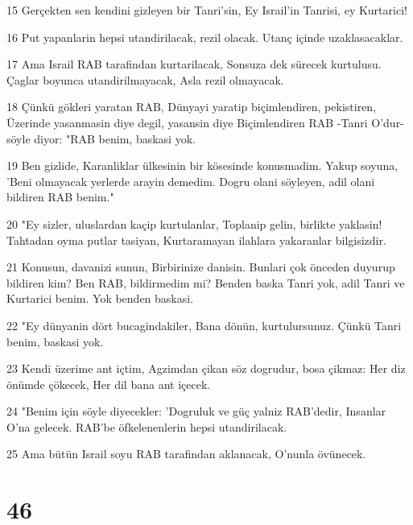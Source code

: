 \par 15 Gerçekten sen kendini gizleyen bir Tanri'sin, Ey Israil'in Tanrisi, ey Kurtarici!
\par 16 Put yapanlarin hepsi utandirilacak, rezil olacak. Utanç içinde uzaklasacaklar.
\par 17 Ama Israil RAB tarafindan kurtarilacak, Sonsuza dek sürecek kurtulusu. Çaglar boyunca utandirilmayacak, Asla rezil olmayacak.
\par 18 Çünkü gökleri yaratan RAB, Dünyayi yaratip biçimlendiren, pekistiren, Üzerinde yasanmasin diye degil, yasansin diye Biçimlendiren RAB -Tanri O'dur- söyle diyor: "RAB benim, baskasi yok.
\par 19 Ben gizlide, Karanliklar ülkesinin bir kösesinde konusmadim. Yakup soyuna, 'Beni olmayacak yerlerde arayin demedim. Dogru olani söyleyen, adil olani bildiren RAB benim."
\par 20 "Ey sizler, uluslardan kaçip kurtulanlar, Toplanip gelin, birlikte yaklasin! Tahtadan oyma putlar tasiyan, Kurtaramayan ilahlara yakaranlar bilgisizdir.
\par 21 Konusun, davanizi sunun, Birbirinize danisin. Bunlari çok önceden duyurup bildiren kim? Ben RAB, bildirmedim mi? Benden baska Tanri yok, adil Tanri ve Kurtarici benim. Yok benden baskasi.
\par 22 "Ey dünyanin dört bucagindakiler, Bana dönün, kurtulursunuz. Çünkü Tanri benim, baskasi yok.
\par 23 Kendi üzerime ant içtim, Agzimdan çikan söz dogrudur, bosa çikmaz: Her diz önümde çökecek, Her dil bana ant içecek.
\par 24 "Benim için söyle diyecekler: 'Dogruluk ve güç yalniz RAB'dedir, Insanlar O'na gelecek. RAB'be öfkelenenlerin hepsi utandirilacak.
\par 25 Ama bütün Israil soyu RAB tarafindan aklanacak, O'nunla övünecek.

\chapter{46}

